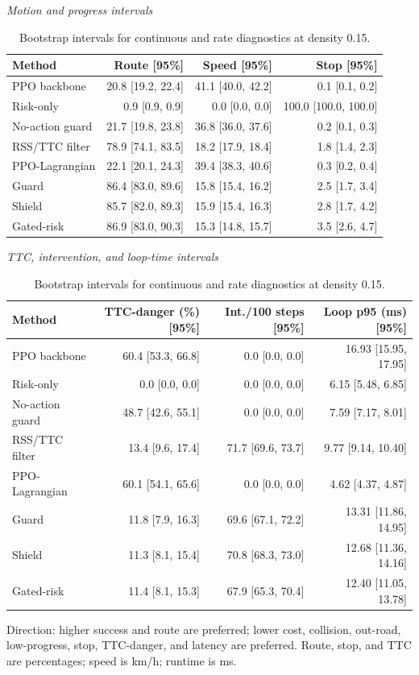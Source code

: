 \begin{table}[!htbp]
\centering
\caption{Bootstrap intervals for continuous and rate diagnostics at density 0.15.}
\label{tab_ci_continuous}
\scriptsize
\setlength{\tabcolsep}{3.2pt}
\renewcommand{\arraystretch}{1.08}
\textit{Motion and progress intervals}\par
\begin{tabular}{@{}lrrr@{}}
\toprule
Method & Route [95\%] & Speed [95\%] & Stop [95\%] \\
\midrule
PPO backbone & 20.8 [19.2, 22.4] & 41.1 [40.0, 42.2] & 0.1 [0.1, 0.2] \\
Risk-only & 0.9 [0.9, 0.9] & 0.0 [0.0, 0.0] & 100.0 [100.0, 100.0] \\
No-action guard & 21.7 [19.8, 23.8] & 36.8 [36.0, 37.6] & 0.2 [0.1, 0.3] \\
RSS/TTC filter & 78.9 [74.1, 83.5] & 18.2 [17.9, 18.4] & 1.8 [1.4, 2.3] \\
PPO-Lagrangian & 22.1 [20.1, 24.3] & 39.4 [38.3, 40.6] & 0.3 [0.2, 0.4] \\
Guard & 86.4 [83.0, 89.6] & 15.8 [15.4, 16.2] & 2.5 [1.7, 3.4] \\
Shield & 85.7 [82.0, 89.3] & 15.9 [15.4, 16.3] & 2.8 [1.7, 4.2] \\
Gated-risk & 86.9 [83.0, 90.3] & 15.3 [14.8, 15.7] & 3.5 [2.6, 4.7] \\
\bottomrule
\end{tabular}
\vspace{3pt}
\textit{TTC, intervention, and loop-time intervals}\par
\begin{tabular}{@{}lrrr@{}}
\toprule
Method & TTC-danger (\%) [95\%] & Int./100 steps [95\%] & Loop p95 (ms) [95\%] \\
\midrule
PPO backbone & 60.4 [53.3, 66.8] & 0.0 [0.0, 0.0] & 16.93 [15.95, 17.95] \\
Risk-only & 0.0 [0.0, 0.0] & 0.0 [0.0, 0.0] & 6.15 [5.48, 6.85] \\
No-action guard & 48.7 [42.6, 55.1] & 0.0 [0.0, 0.0] & 7.59 [7.17, 8.01] \\
RSS/TTC filter & 13.4 [9.6, 17.4] & 71.7 [69.6, 73.7] & 9.77 [9.14, 10.40] \\
PPO-Lagrangian & 60.1 [54.1, 65.6] & 0.0 [0.0, 0.0] & 4.62 [4.37, 4.87] \\
Guard & 11.8 [7.9, 16.3] & 69.6 [67.1, 72.2] & 13.31 [11.86, 14.95] \\
Shield & 11.3 [8.1, 15.4] & 70.8 [68.3, 73.0] & 12.68 [11.36, 14.16] \\
Gated-risk & 11.4 [8.1, 15.3] & 67.9 [65.3, 70.4] & 12.40 [11.05, 13.78] \\
\bottomrule
\end{tabular}
\begin{tablenotes}
\item Direction: higher success and route are preferred; lower cost, collision, out-road, low-progress, stop, TTC-danger, and latency are preferred. Route, stop, and TTC are percentages; speed is km/h; runtime is ms.
\end{tablenotes}
\end{table}
